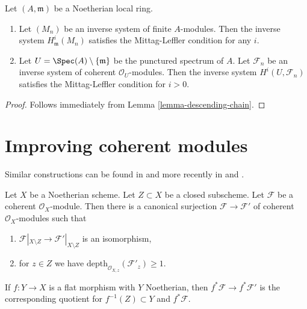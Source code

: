 \begin{lemma}
\label{lemma-ML-local}
Let $(A, \mathfrak m)$ be a Noetherian local ring.
\begin{enumerate}
\item Let $(M_n)$ be an inverse system of finite $A$-modules. Then the
inverse system $H^i_\mathfrak m(M_n)$ satisfies the Mittag-Leffler
condition for any $i$.
\item Let $U = \Spec(A) \setminus \{\mathfrak m\}$ be the
punctured spectrum of $A$.
Let $\mathcal{F}_n$ be an inverse system of
coherent $\mathcal{O}_U$-modules.
Then the inverse system $H^i(U, \mathcal{F}_n)$
satisfies the Mittag-Leffler condition for $i > 0$.
\end{enumerate}
\end{lemma}

\begin{proof}
Follows immediately from Lemma \ref{lemma-descending-chain}.
\end{proof}






\section{Improving coherent modules}
\label{section-improve}

\noindent
Similar constructions can be found in \cite{EGA} and more recently in
\cite{Kollar-local-global-hulls} and \cite{Kollar-variants}.

\begin{lemma}
\label{lemma-get-depth-1-along-Z}
Let $X$ be a Noetherian scheme. Let $Z \subset X$ be a closed subscheme.
Let $\mathcal{F}$ be a coherent $\mathcal{O}_X$-module.
Then there is a canonical surjection $\mathcal{F} \to \mathcal{F}'$
of coherent $\mathcal{O}_X$-modules such that
\begin{enumerate}
\item $\mathcal{F}|_{X \setminus Z} \to \mathcal{F}'|_{X \setminus Z}$
is an isomorphism,
\item for $z \in Z$ we have
$\text{depth}_{\mathcal{O}_{X, z}}(\mathcal{F}'_z) \geq 1$.
\end{enumerate}
If $f : Y \to X$ is a flat morphism with $Y$ Noetherian, then
$f^*\mathcal{F} \to f^*\mathcal{F}'$ is the corresponding
quotient for $f^{-1}(Z) \subset Y$ and $f^*\mathcal{F}$.
\end{lemma}

